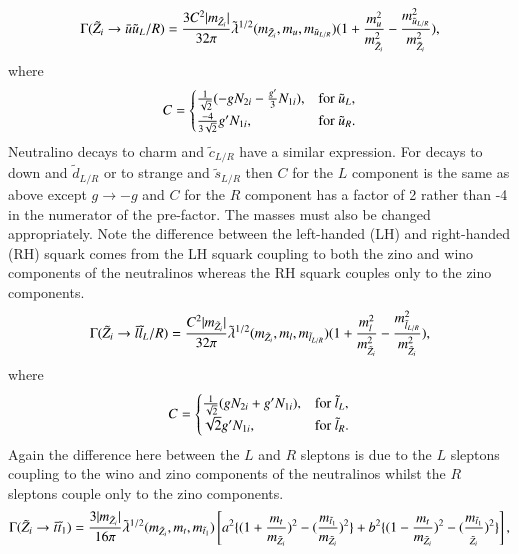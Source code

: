 \documentclass[final,3p,times,pdflatex]{elsarticle}
\begin{document}
\begin{equation}\label{neutuuLR}
\Gamma (\tilde{Z}_i \rightarrow \bar{u} \tilde{u}_L/R) = {3 C^2 |m_{\tilde{Z}_i}| \over 32\pi} \tilde{\lambda}^{1/2} (m_{\tilde{Z}_i}, m_u, m_{\tilde{u}_{L/R}}) (1+ {m_{u}^2 \over m_{\tilde{Z}_i}^2}  - {m_{\tilde{u}_{L/R}}^2 \over m_{\tilde{Z}_i}^2}),
\end{equation} 
where
\begin{equation}
  C=\begin{cases}
    {1 \over \sqrt{2}}(-g N_{2i} - {g' \over 3} N_{1i}), & \text{for $\tilde{u}_L$},\\
    {-4 \over 3\sqrt{2}}g' N_{1i}, & \text{for $\tilde{u}_R$}.
  \end{cases}
\end{equation}
Neutralino decays to charm and $\tilde{c}_{L/R}$ have a similar expression.
For decays to down and $\tilde{d}_{L/R}$ or to strange and $\tilde{s}_{L/R}$ then $C$ for the $L$ component is the
same as above except $g \rightarrow -g$ and $C$ for the $R$ component has a factor of 2 rather than -4 in the
numerator of the pre-factor. The masses must also be changed appropriately. Note the
difference between the left-handed (LH) and right-handed
(RH) squark comes from the LH squark coupling to both the zino and
wino components of the neutralinos whereas the RH squark couples only to the zino components.
\begin{equation}\label{neutllLR}
\Gamma (\tilde{Z}_i \rightarrow \bar{l} \tilde{l}_L/R) = {C^2 |m_{\tilde{Z}_i}| \over 32\pi} \tilde{\lambda}^{1/2} (m_{\tilde{Z}_i}, m_l, m_{\tilde{l}_{L/R}}) (1+ {m_{l}^2 \over m_{\tilde{Z}_i}^2}  - {m_{\tilde{l}_{L/R}}^2 \over m_{\tilde{Z}_i}^2}),
\end{equation} 
where
\begin{equation}
  C=\begin{cases}
    {1 \over \sqrt{2}}(g N_{2i} + g' N_{1i}), & \text{for $\tilde{l}_L$},\\
    \sqrt{2} g' N_{1i}, & \text{for $\tilde{l}_R$}.
  \end{cases}
\end{equation}
Again the difference here between the $L$ and $R$ sleptons is due to the $L$ sleptons coupling to the wino
and zino components of the neutralinos whilst the $R$ sleptons couple only to the zino components.
\begin{equation}\label{neuttst1}
\Gamma (\tilde{Z}_i \rightarrow \bar{t} \tilde{t}_{1}) = {3 |m_{\tilde{Z}_i}| \over 16\pi} \tilde{\lambda}^{1/2} (m_{\tilde{Z}_i}, m_t, m_{\tilde{t}_{1}}) \left[a^2\{(1+{m_t \over m_{\tilde{Z}_i}})^2 - ({m_{\tilde{t}_1} \over m_{\tilde{Z}_i}})^2\} + b^2\{(1-{m_t \over m_{\tilde{Z}_i}})^2 - ({m_{\tilde{t}_1} \over _{\tilde{Z}_i}})^2\}\right],
\end{equation} 
\end{document}
